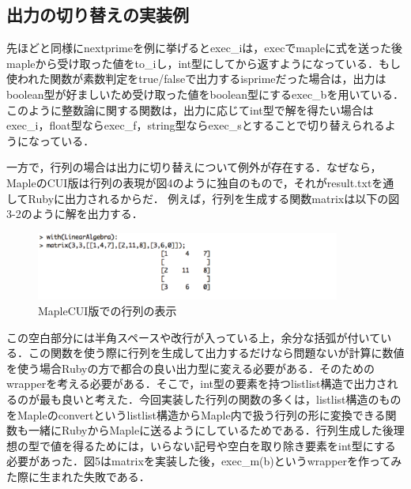 \subsection{出力の切り替えの実装例}
先ほどと同様にnextprimeを例に挙げるとexec\_iは，execでmapleに式を送った後mapleから受け取った値をto\_iし，int型にしてから返すようになっている．もし使われた関数が素数判定をtrue/falseで出力するisprimeだった場合は，出力はboolean型が好ましいため受け取った値をboolean型にするexec\_bを用いている．このように整数論に関する関数は，出力に応じてint型で解を得たい場合はexec\_i，float型ならexec\_f，string型ならexec\_sとすることで切り替えられるようになっている．

一方で，行列の場合は出力に切り替えについて例外が存在する．なぜなら，MapleのCUI版は行列の表現が図4のように独自のもので，それがresult.txtを通してRubyに出力されるからだ．
例えば，行列を生成する関数matrixは以下の図3-2のように解を出力する．

\begin{figure}[htbp]\begin{center}
\includegraphics[width=10cm,bb= 0 0 737 553]{../figs/./mapleruby_eringi.exmatrix.png}
\caption{MapleCUI版での行列の表示}
\label{default}\end{center}\end{figure}
この空白部分には半角スペースや改行が入っている上，余分な括弧が付いている．この関数を使う際に行列を生成して出力するだけなら問題ないが計算に数値を使う場合Rubyの方で都合の良い出力型に変える必要がある．そのためのwrapperを考える必要がある．そこで，int型の要素を持つlistlist構造で出力されるのが最も良いと考えた．今回実装した行列の関数の多くは，listlist構造のものをMapleのconvertというlistlist構造からMaple内で扱う行列の形に変換できる関数も一緒にRubyからMapleに送るようにしているためである．行列生成した後理想の型で値を得るためには，いらない記号や空白を取り除き要素をint型にする必要があった．図5はmatrixを実装した後，exec\_m(b)というwrapperを作ってみた際に生まれた失敗である．

